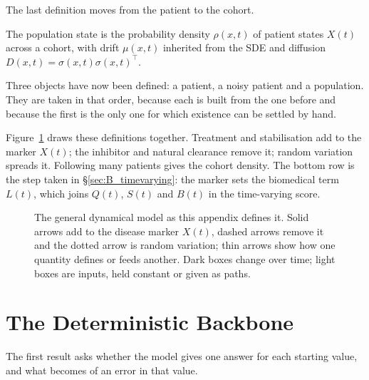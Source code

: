 The last definition moves from the patient to the cohort.

\begin{definition}
\label{def:B_population}
The population state is the probability density $\rho(x,t)$ of patient states
$X(t)$ across a cohort, with drift $\mu(x,t)$ inherited from the SDE and
diffusion $D(x,t)=\sigma(x,t)\sigma(x,t)^\top$.

Three objects have now been defined: a patient, a noisy patient and a
population. They are taken in that order, because each is built from the one
before and because the first is the only one for which existence can be settled
by hand.
\end{definition}

Figure~\ref{fig:B-schematic} draws these definitions together. Treatment and
stabilisation add to the marker $X(t)$; the inhibitor and natural clearance
remove it; random variation spreads it. Following many patients gives the
cohort density. The bottom row is the step taken in \S\ref{sec:B_timevarying}:
the marker sets the biomedical term $L(t)$, which joins $Q(t)$, $S(t)$ and
$B(t)$ in the time-varying score.

\begin{figure}[htbp]\centering

\caption{The general dynamical model as this appendix defines it. Solid arrows
add to the disease marker $X(t)$, dashed arrows remove it and the dotted arrow is
random variation; thin arrows show how one quantity defines or feeds another.
Dark boxes change over time; light boxes are inputs, held constant or given as
paths.}
\label{fig:B-schematic}
\end{figure}

\section{The Deterministic Backbone}
\label{sec:B_ode}

The first result asks whether the model gives one answer for each starting
value, and what becomes of an error in that value.

